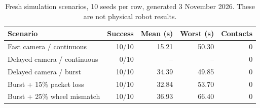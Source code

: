 \begin{table}[ht]\centering\small

\begin{tabularx}{\textwidth}{@{}Yrrrr@{}}\toprule

Scenario & Success & Mean (s) & Worst (s) & Contacts\\\midrule

Fast camera / continuous & 10/10 & 15.21 & 50.30 & 0\\

Delayed camera / continuous & 0/10 & -- & -- & 0\\

Delayed camera / burst & 10/10 & 34.39 & 49.85 & 0\\

Burst + 15\% packet loss & 10/10 & 32.84 & 53.70 & 0\\

Burst + 25\% wheel mismatch & 10/10 & 36.93 & 66.40 & 0\\

\bottomrule\end{tabularx}

\caption{Fresh simulation scenarios, 10 seeds per row, generated 3 November 2026. These are not physical robot results.}\label{tab:scenarios}\end{table}